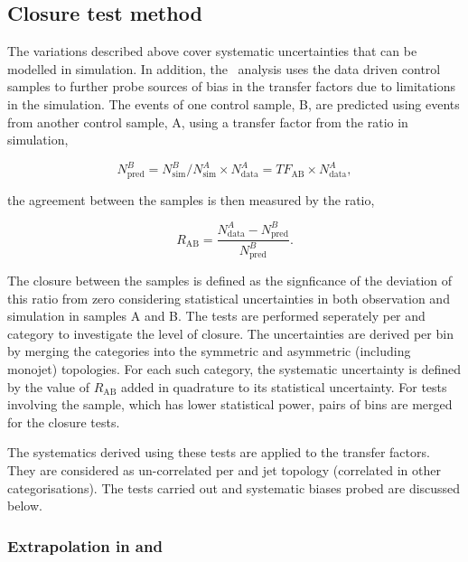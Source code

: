 \subsection{Closure test method}
\label{sec:closure-tests}
The variations described above cover systematic uncertainties that can be modelled
in simulation. In addition, the \alphat~analysis uses the data driven control samples to
further probe sources of bias in the transfer factors due to limitations in the simulation.
The events of one control sample, B, are predicted using events from another control sample, A,
using a transfer factor from the ratio in simulation, 

\begin{equation}
N^{B}_{\text{pred}} = N^{B}_{\text{sim}}/N^{A}_{\text{sim}} \times N^{A}_{\text{data}} = TF_{\text{AB}} \times N^{A}_{\text{data}},
\end{equation}

the agreement between the samples is then measured by the ratio, 

\begin{equation}
R_{\text{AB}} = \frac{N^{A}_{\text{data}}-N^{B}_{\text{pred}}}{N^{B}_{\text{pred}}}.
\end{equation}


The closure between the samples is defined as the signficance of the deviation of this ratio from zero 
considering statistical uncertainties in both observation and simulation in samples A and B.
The tests are performed seperately per \njet and \scalht category to investigate the level of closure. 
The uncertainties are derived per \scalht bin by merging the \njet categories into 
the symmetric and asymmetric (including monojet) topologies. For each such category, the systematic
uncertainty is defined by the value of $R_{\text{AB}}$ added in quadrature to its statistical uncertainty.
For tests involving the \mmj sample, which has lower statistical power, pairs of \scalht bins 
are merged for the closure tests. 

The systematics derived using these tests are applied to the transfer factors. They are considered
as un-correlated per \scalht and jet topology (correlated in other categorisations). The tests carried 
out and systematic biases probed are discussed below.

\subsubsection{Extrapolation in \alphat and \bdphi}

